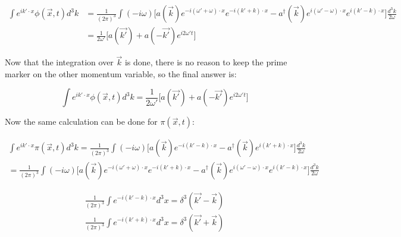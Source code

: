 \documentclass{article}
\begin{document}
    \begin{equation} 
        \begin{aligned}
            \int e^{i k' \cdot x} \phi (\vec{x}, t) d^{3}k & = \frac{1}{(2 \pi)^3} \int (- i \omega) \Big[ a(\vec{k}) e^{-i (\omega' + \omega) \cdot x} e^{-i (k' + k) \cdot x} - a^{\dag}(\vec{k}) e^{i (\omega' - \omega) \cdot x} e^{i (k' - k) \cdot x} \Big] \frac{d^3k}{2 \omega} \\
            & = \frac{1}{2 \omega'} \big[ a(\vec{k'}) + a(-\vec{k'}) e^{i 2 \omega' t} \big]
        \end{aligned}
    \end{equation}

    Now that the integration over $\vec{k}$ is done, there is no reason to keep the prime marker on the other
    momentum variable, so the final answer is:

    \begin{equation}
        \int e^{i k' \cdot x} \phi (\vec{x}, t) d^{3}k = \frac{1}{2 \omega'} \big[ a(\vec{k'}) + a(-\vec{k'}) e^{i 2 \omega' t} \big]
    \end{equation}

    Now the same calculation can be done for $\pi (\vec{x}, t)$:

    \begin{equation}
        \begin{aligned}
            \int e^{i k' \cdot x} \pi (\vec{x}, t) d^{3}k  = \frac{1}{(2 \pi)^3} \int (- i \omega) \Big[ a(\vec{k}) e^{-i (k' - k) \cdot x} - a^{\dag}(\vec{k}) e^{i (k' + k) \cdot x} \Big] \frac{d^3k}{2 \omega} \\
            = \frac{1}{(2 \pi)^3} \int (- i \omega) \Big[ a(\vec{k}) e^{-i (\omega' + \omega) \cdot x} e^{-i (k' + k) \cdot x} - a^{\dag}(\vec{k}) e^{i (\omega' - \omega) \cdot x} e^{i (k' - k) \cdot x} \Big] \frac{d^3k}{2 \omega}
        \end{aligned}
    \end{equation}

    \begin{equation}
        \begin{aligned}
            \frac{1}{(2 \pi)^3} \int e^{-i (k' - k) \cdot x} d^{3}x = \delta^{3} (\vec{k'} - \vec{k}) \\
            \frac{1}{(2 \pi)^3} \int e^{-i (k' + k) \cdot x} d^{3}x = \delta^{3} (\vec{k'} + \vec{k})
        \end{aligned}
    \end{equation}
\end{document}
